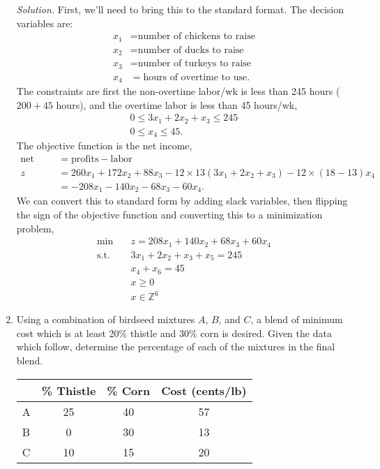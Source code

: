 \documentclass{homework}
\newcommand{\st}{\mathrm{s.t.}}
\newcommand{\solution}{	\vspace{1em} \textit{Solution.} \quad }
\newcommand{\bolditem}[1][YYY]{\item[\textbf{#1}]}
\begin{document}
\begin{enumerate}
		\solution First, we'll need to bring this to the standard format. The decision variables are: \begin{align*}
			x_1 & = \text{number of chickens to raise} \\
			x_2 & = \text{number of ducks to raise} \\
			x_3 & = \text{number of turkeys to raise} \\
			x_4 & = \text{hours of overtime to use}.
		\end{align*}
		The constraints are first the non-overtime labor/wk is less than 245 hours ($200 + 45$ hours), and the overtime labor is less than 45 hours/wk, \begin{align*}
			0 \le 3 x_1 + 2 x_2 +  x_3 \le 245 \\
			0 \le x_4 \le 45.
		\end{align*}
		The objective function is the net income, \begin{align*}
			\text{net income} & = \text{profits} - \text{labor} \\
			z	& = 260 x_1 + 172 x_2 + 88 x_3 - 12 \times 13 (3 x_1 + 2 x_2 +  x_3) - 12 \times (18-13) x_4 \\
				& = -208x_1 - 140x_2 - 68x_3 - 60x_4.
		\end{align*}
		We can convert this to standard form by adding slack variables, then flipping the sign of the objective function and converting this to a minimization problem, \begin{align*}
			\min  \quad & z = 208 x_1 + 140 x_2 + 68 x_3 + 60 x_4 \\
			\st \quad & 3 x_1 + 2 x_2 + x_3 + x_5 = 245 \\
			& x_4 + x_6 = 45 \\
			& x \ge 0 \\
			& x \in \mathbb{Z}^6
		\end{align*}
		
		
	
		\bolditem[3.6.3] Using a combination of birdseed mixtures $A$, $B$, and $C$, a blend of minimum cost which is at least 20\% thistle and 30\% corn is desired. Given the data which follow, determine the percentage of each of the mixtures in the final blend. \begin{center}
			\begin{tabular}{lccc}
				\toprule
				& \% Thistle & \% Corn & Cost (cents/lb) \\
				\midrule
				A & 25 & 40 & 57 \\
				B & 0 & 30 & 13 \\
				C & 10 & 15 & 20 \\
				\bottomrule
			\end{tabular}
		\end{center}
	

\end{enumerate}
\end{document}
